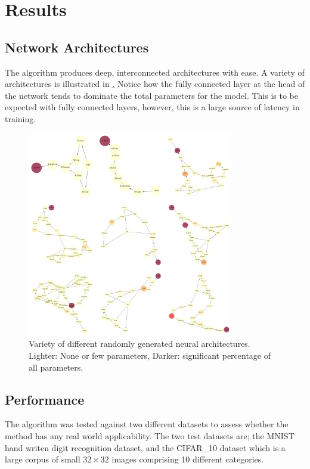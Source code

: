 \section{Results}
    \label{sec:results}
    \subsection{Network Architectures}
        The algorithm produces deep, interconnected architectures with ease. A variety of architectures is illustrated in \href{fig:arch}. Notice how the fully connected layer at the head of the network tends to dominate the total parameters for the model. This is to be expected with fully connected layers, however, this is a large source of latency in training.

        \begin{figure}[H]
            \centering
            \label{fig:arch}
            \includegraphics[width=0.8\textwidth]{4_results/imgs/ras/grid.png}
            \caption{Variety of different randomly generated neural architectures. Lighter: None or few parameters, Darker: significant percentage of all parameters.}
        \end{figure}

\newpage
        \subsection{Performance}

The algorithm was tested against two different datasets to assess whether the method has any real world applicability. The two test datasets are; the MNIST hand writen digit recognition dataset, and the CIFAR\_10 dataset which is a large corpus of small $32 \times 32$  images comprising 10 different categories.


